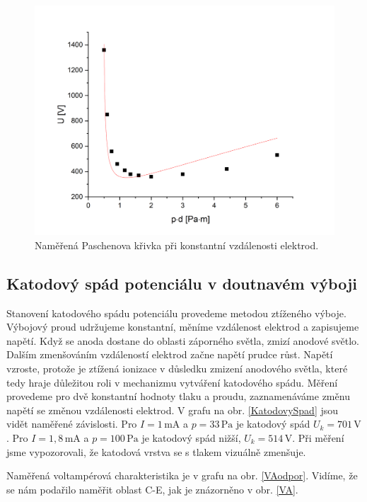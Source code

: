 \documentclass[a4paper,12pt]{article}
\begin{document}
\begin{figure}[h]
	\centering
	\includegraphics[width=130mm]{dfixed.png}
	\caption{Naměřená Paschenova křivka při konstantní vzdálenosti elektrod.}
	\label{dfixed}
\end{figure}

\newpage
\subsection{Katodový spád potenciálu v doutnavém výboji}
Stanovení katodového spádu potenciálu provedeme metodou ztíženého výboje. Výbojový proud udržujeme konstantní, měníme vzdálenost elektrod a zapisujeme napětí. Když se anoda dostane do oblasti záporného světla, zmizí anodové světlo. Dalším zmenšováním vzdáleností elektrod začne napětí prudce růst. Napětí vzroste, protože je ztížená ionizace v důsledku zmizení anodového světla, které tedy hraje důležitou roli v mechanizmu vytváření katodového spádu. Měření provedeme pro dvě konstantní hodnoty tlaku a proudu, zaznamenáváme změnu napětí se změnou vzdálenosti elektrod. V grafu na obr. \ref{KatodovySpad} jsou vidět naměřené závislosti. Pro $I = 1\,\si{\milli\ampere}$ a $p = 33\,\si{\pascal}$ je katodový spád $U_k = 701\,\si{\volt}$. Pro $I = 1,8\,\si{\milli\ampere}$ a $p = 100\,\si{\pascal}$ je katodový spád nižší,  $U_k = 514\,\si{\volt}$. Při měření jsme vypozorovali, že katodová vrstva se s tlakem vizuálně zmenšuje.


Naměřená voltampérová charakteristika je v grafu na obr. \ref{VAodpor}. Vidíme, že se nám podařilo naměřit oblast C-E, jak je znázorněno v obr. \ref{VA}.
\end{document}

